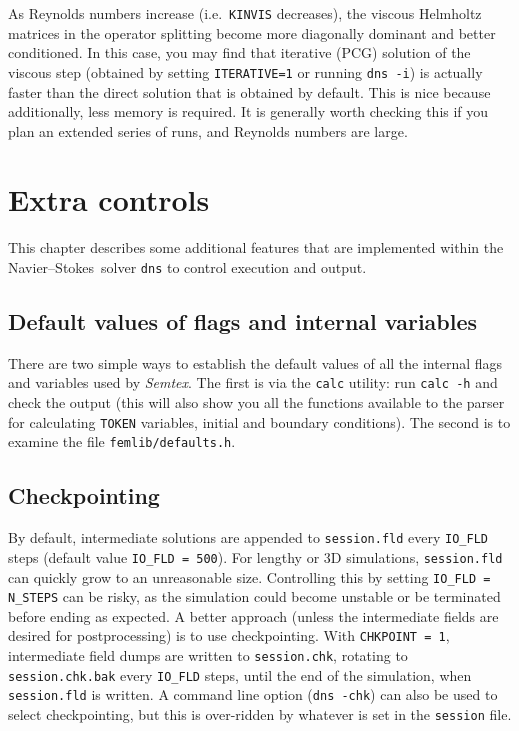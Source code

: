 \documentclass[11pt,a4paper]{report}
\newcommand{\Semtex}{\emph{Semtex}}
\newcommand{\ie}{i.e.\ }
\newcommand\NavSto{Navier--Stokes}
\begin{document}
As Reynolds numbers increase (\ie \verb+KINVIS+ decreases), the
viscous Helmholtz matrices in the operator splitting become more
diagonally dominant and better conditioned. In this case, you may find
that iterative (PCG) solution of the viscous step (obtained by setting
\verb|ITERATIVE=1| or running \verb|dns -i|) is actually faster than
the direct solution that is obtained by default. This is nice because
additionally, less memory is required. It is generally worth checking
this if you plan an extended series of runs, and Reynolds numbers are
large.

\chapter{Extra controls}

This chapter describes some additional features that are implemented
within the \NavSto\ solver \verb+dns+ to control execution and
output.

\section{Default values of flags and internal variables}
\label{sec.default}

There are two simple ways to establish the default values of all the
internal flags and variables used by \Semtex. The first is via
the \verb+calc+ utility: run \verb+calc -h+ and check the output (this
will also show you all the functions available to the parser for
calculating \verb+TOKEN+ variables, initial and boundary
conditions). The second is to examine the file
\verb+femlib/defaults.h+.

\section{Checkpointing}
\label{sec.check}

By default, intermediate solutions are appended to \verb+session.fld+
every \verb+IO_FLD+ steps (default value \verb+IO_FLD = 500+).  For
lengthy or 3D simulations, \verb+session.fld+ can quickly grow to an
unreasonable size.  Controlling this by setting \verb+IO_FLD = N_STEPS+
can be risky, as the simulation could become unstable or be terminated
before ending as expected.  A better approach (unless the intermediate
fields are desired for postprocessing) is to use checkpointing.  With
\verb+CHKPOINT = 1+, intermediate field dumps are written to
\verb+session.chk+, rotating to \verb+session.chk.bak+ every
\verb+IO_FLD+ steps, until the end of the simulation, when
\verb+session.fld+ is written.  A command line option (\verb+dns -chk+)
can also be used to select checkpointing, but this is
over-ridden by whatever is set in the \verb+session+ file.
\end{document}
